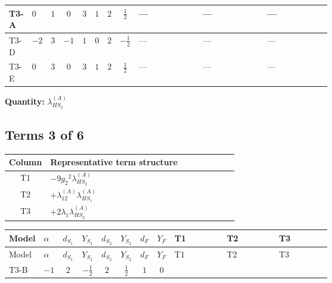 \documentclass[8pt]{article}
\begin{document}
\begin{landscape}
\begin{longtable}{@{}llcccccc >{\raggedright\arraybackslash}p{0.21\linewidth} >{\raggedright\arraybackslash}p{0.21\linewidth} >{\raggedright\arraybackslash}p{0.21\linewidth}@{}}
\midrule
T3-A & $0$ & $1$ & $0$ & $3$ & $1$ & $2$ & $\frac{1}{2}$ & --- & --- & --- \\
\midrule
T3-D & $-2$ & $3$ & $-1$ & $1$ & $0$ & $2$ & $-\frac{1}{2}$ & --- & --- & --- \\
\midrule
T3-E & $0$ & $3$ & $0$ & $3$ & $1$ & $2$ & $\frac{1}{2}$ & --- & --- & --- \\
\midrule
\bottomrule
\end{longtable}
\clearpage
\noindent\textbf{Quantity: }$\lambda_{HS_2}^{(A)}$\par\smallskip
\subsection*{Terms 3 of 6}
\begin{center}
\begin{tabular}{@{}c >{\raggedright\arraybackslash}p{0.82\linewidth}@{}}
\toprule
Column & Representative term structure \\
\midrule
T1 & \(\displaystyle -9 {g_2}^2 {\lambda_{HS_2}^{(A)}}\) \\
\midrule
T2 & \(\displaystyle +{\lambda_{12}^{(A)}} {\lambda_{HS_1}^{(A)}}\) \\
\midrule
T3 & \(\displaystyle +2 {\lambda_1} {\lambda_{HS_2}^{(A)}}\) \\
\midrule
\bottomrule
\end{tabular}
\end{center}
\smallskip
\tiny
\begin{longtable}{@{}llcccccc >{\raggedright\arraybackslash}p{0.21\linewidth} >{\raggedright\arraybackslash}p{0.21\linewidth} >{\raggedright\arraybackslash}p{0.21\linewidth}@{}}
\toprule
Model & $\alpha$ & $d_{S_1}$ & $Y_{S_1}$ & $d_{S_2}$ & $Y_{S_2}$ & $d_F$ & $Y_F$ & T1 & T2 & T3 \\
\midrule
\endfirsthead
\toprule
Model & $\alpha$ & $d_{S_1}$ & $Y_{S_1}$ & $d_{S_2}$ & $Y_{S_2}$ & $d_F$ & $Y_F$ & T1 & T2 & T3 \\
\midrule
\endhead
T3-B & $-1$ & $2$ & $-\frac{1}{2}$ & $2$ & $\frac{1}{2}$ & $1$ & $0$ & \scriptsize\adjustbox{max width=\linewidth}{$\begin{gathered} -9 {g_2}^2 {\lambda_{HS_2}^{(A)}}\end{gathered}$} & \scriptsize\adjustbox{max width=\linewidth}{$\begin{gathered} +{\lambda_{12}^{(A)}} {\lambda_{HS_1}^{(A)}}\end{gathered}$} & \scriptsize\adjustbox{max width=\linewidth}{$\begin{gathered} +2 {\lambda_1} {\lambda_{HS_2}^{(A)}}\end{gathered}$} \\

\end{longtable}
\end{landscape}
\end{document}
